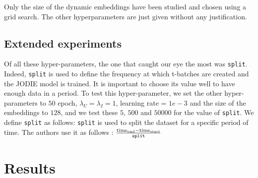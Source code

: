 Only the size of the dynamic embeddings have been studied and chosen using a grid search. The other hyperparameters are just given without any justification.

\subsection*{Extended experiments}

Of all these hyper-parameters, the one that caught our eye the most was \texttt{split}. Indeed, \texttt{split} is used to define the frequency at which t-batches are created and the JODIE model is trained. It is important to choose its value well to have enough data in a period. To test this hyper-parameter, we set the other hyper-parameters to $50$ epoch, $\lambda_U = \lambda_I = 1$, learning rate = $1e-3$ and the size of the embeddings to $128$, and we test these $5$, $500$ and $50000$ for the value of \texttt{split}. We define \texttt{split} as follows:
\texttt{split} is used to split the dataset for a specific period of time. The authors use it as follows : $\frac{\text{time}_{\text{end}} - \text{time}_{\text{start}}}{\text{\texttt{split}}}$

\section*{Results}


